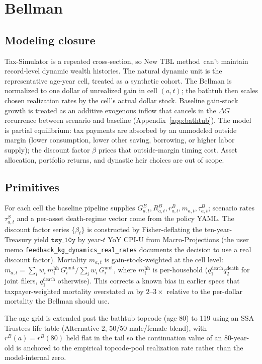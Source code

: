 \documentclass[11pt]{article}
\newcommand{\dyn}{New TBL method}
\newcommand{\tauB}{\tau^{B}}
\newcommand{\tauS}{\tau^{S}}
\newcommand{\rB}{r^{B}}
\newcommand{\GB}{G^{B}}
\newcommand{\RB}{R^{B}}
\begin{document}
\section{Bellman}
\label{app:bellman}

\subsection{Modeling closure}

Tax-Simulator is a repeated cross-section, so \dyn\ can't maintain
record-level dynamic wealth histories. The natural dynamic unit is the
representative age-year cell, treated as a synthetic cohort. The Bellman
is normalized to one dollar of unrealized gain in cell $(a, t)$; the
bathtub then scales chosen realization rates by the cell's actual dollar
stock. Baseline gain-stock growth is treated as an additive exogenous
inflow that cancels in the $\Delta G$ recurrence between scenario and
baseline (Appendix~\ref{app:bathtub}). The model is partial equilibrium:
tax payments are absorbed by an unmodeled outside margin (lower
consumption, lower other saving, borrowing, or higher labor supply); the
discount factor $\beta$ prices that outside-margin timing cost. Asset
allocation, portfolio returns, and dynastic heir choices are out of scope.

\subsection{Primitives}

For each cell the baseline pipeline supplies $\GB_{a,t}, \RB_{a,t},
\rB_{a,t}, m_{a,t}, \tauB_{a,t}$; scenario rates $\tauS_{a,t}$ and a
per-asset death-regime vector come from the policy YAML. The discount
factor series $\{\beta_t\}$ is constructed by Fisher-deflating the
ten-year-Treasury yield $\texttt{tsy\_10y}$ by year-$t$ YoY CPI-U from
Macro-Projections (the user memo \texttt{feedback\_kg\_dynamics\_real\_rates}
documents the decision to use a real discount factor). Mortality $m_{a,t}$
is gain-stock-weighted at the cell level:
$m_{a,t} = \sum_i w_i\,m^{\text{hh}}_i\,G^{\text{unit}}_i \big/
          \sum_i w_i\,G^{\text{unit}}_i$,
where $m^{\text{hh}}_i$ is per-household ($q^{\text{death}}_1 q^{\text{death}}_2$
for joint filers, $q^{\text{death}}_1$ otherwise). This corrects a known
bias in earlier specs that taxpayer-weighted mortality overstated $m$ by
$2$--$3\times$ relative to the per-dollar mortality the Bellman should use.

The age grid is extended past the bathtub topcode (age 80) to 119 using an
SSA Trustees life table (Alternative 2, 50/50 male/female blend), with
$r^B(a) = r^B(80)$ held flat in the tail so the continuation value of an
80-year-old is anchored to the empirical topcode-pool realization rate rather
than the model-internal zero.
\end{document}
